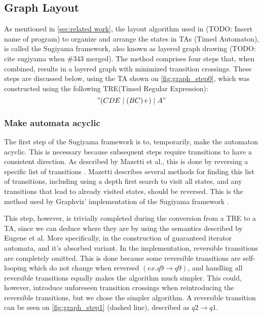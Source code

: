 \subsection{Graph Layout}





As mentioned in \cref{sec:related work}, the layout algorithm used in (TODO: Insert name of program) to organize and arrange the states in TAs (Timed Automaton), is called the Sugiyama framework, also known as layered graph drawing (TODO: cite sugiyama when \#343 merged). The method comprises four steps that, when combined, results in a layered graph with minimized transition crossings. These steps are discussed below, using the TA shown on \cref{fig:graph_step0}, which was constructed using the following TRE(Timed Regular Expression): $$"(CDE\mid(BC)+)\mid A"$$



\subsubsection{Make automata acyclic}
The first step of the Sugiyama framework is to, temporarily, make the automaton acyclic. This is necessary because subsequent steps require transitions to have a consistent direction. As described by Mazetti et al., this is done by reversing a specific list of transitions \cite{Mazetti2012}.
Mazetti describes several methods for finding this list of transitions, including using a depth first search to visit all states, and any transitions that lead to already visited states, should be reversed.
This is the method used by Graphviz' implementation of the Sugiyama framework \cite{Graphviz}. %

This step, however, is trivially completed during the conversion from a TRE to a TA, since we can deduce where they are by using the semantics described by Eugene et al.
More specifically, in the construction of guaranteed iterator automata, and it's absorbed variant\cite{Eugene2001}.
In the implementation, reversible transitions are completely omitted. This is done because some reversible transitions are self-looping which do not change when reversed $(ex. q9\rightarrow q9)$, and handling all reversible transitions equally makes the algorithm much simpler. This could, however, introduce unforeseen transition crossings when reintroducing the reversible transitions, but we chose the simpler algorithm. A reversible transition can be seen on \cref{fig:graph_step1} (dashed line), described as $q2\rightarrow q1$.

